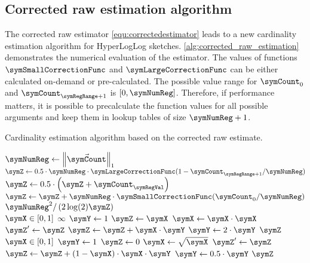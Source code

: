\documentclass[a4paper]{scrartcl}
\begin{document}
\subsection{Corrected raw estimation algorithm}
The corrected raw estimator \eqref{equ:correctedestimator} leads to a new cardinality estimation algorithm for HyperLogLog sketches. \cref{alg:corrected_raw_estimation} demonstrates the numerical evaluation of the estimator. The values of functions $\symSmallCorrectionFunc$ and $\symLargeCorrectionFunc$ can be either calculated on-demand or pre-calculated. The possible value range for $\symCount_0$ and $\symCount_{\symRegRange+1}$ is $[0, \symNumReg]$. Therefore, if performance matters, it is possible to precalculate the function values for all possible arguments and keep them in lookup tables of size $\symNumReg+1$. 

\begin{algorithm}
\caption{Cardinality estimation algorithm based on the corrected raw estimate.}
\label{alg:corrected_raw_estimation}
\begin{algorithmic}
\State $\symNumReg \gets \left\Vert\vec{\symCount}\right\Vert_1$
\State $\symZ\gets 0.5\cdot \symNumReg\cdot\symLargeCorrectionFunc(1 - \symCount_{\symRegRange+1}/\symNumReg)$
\State $\symZ\gets0.5\cdot\left(\symZ + \symCount_\symRegVal\right)$
\EndFor
\State $\symZ\gets\symZ+\symNumReg\cdot\symSmallCorrectionFunc(\symCount_0/\symNumReg)$
\State \Return$\symNumReg^2 / \left(2\log(2)\symZ\right)$
\EndFunction
\\
\Function {$\symSmallCorrectionFunc$}{$\symX$}
\Comment $\symX\in[0,1]$
\State\Return$\infty$
\EndIf
\State $\symY\gets1$
\State $\symZ\gets\symX$
\Repeat
\State $\symX\gets\symX\cdot\symX$
\State $\symZ'\gets\symZ$
\State $\symZ\gets\symZ + \symX\cdot\symY$
\State $\symY\gets2\cdot\symY$
\State\Return$\symZ$
\EndFunction
\\
\Function {$\symLargeCorrectionFunc$}{$\symX$}
\Comment $\symX\in[0,1]$
\State $\symY\gets1$
\State $\symZ\gets0$
\Repeat
\State $\symX\gets\sqrt{\symX}$
\State $\symZ'\gets\symZ$
\State $\symZ\gets\symZ + \left(1-\symX\right)\cdot\symX\cdot\symY$
\State $\symY\gets0.5\cdot\symY$
\State\Return$\symZ$
\EndFunction
\end{algorithmic}
\end{algorithm}
\end{document}
